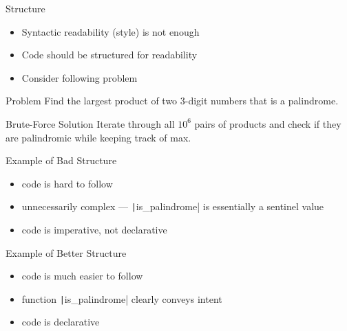 \begin{frame}{Structure}
    \begin{itemize}[<+->]
        \item Syntactic readability (style) is not enough
        \item Code should be structured for readability
        \item Consider following problem
    \end{itemize}
    \pause
    \begin{block}{Problem}
        Find the largest product of two 3-digit numbers that is a palindrome.
    \end{block}
    \pause
    \begin{block}{Brute-Force Solution}
        Iterate through all $10^6$ pairs of products and check if they are palindromic while keeping track of max.
    \end{block}
\end{frame}
\begin{frame}{Example of Bad Structure}
    \pause
    \pause
    \begin{minipage}{0.3\textwidth}
        \vspace{-2.5in}\begin{itemize}[<+->]
            \item code is hard to follow
            \item unnecessarily complex --- \texttt|is_palindrome| is essentially a sentinel value
            \item code is imperative, not declarative
        \end{itemize}
    \end{minipage}
\end{frame}

\begin{frame}{Example of Better Structure}
    \pause
    \pause
    \begin{minipage}{0.3\textwidth}
        \vspace{-2in}\begin{itemize}[<+->]
            \item code is much easier to follow
            \item function \texttt|is_palindrome| clearly conveys intent
            \item code is declarative
        \end{itemize}
    \end{minipage}
\end{frame}

